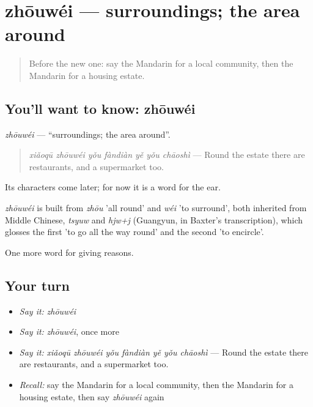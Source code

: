 \section[zhōuwéi]{zhōuwéi — surroundings; the area around}

\label{lesson:ZH-C377-zhouwei}



\begin{quote}
Before the new one: say the Mandarin for a local community, then the Mandarin for a housing estate.
\end{quote}

\subsection*{You'll want to know: zhōuwéi}
\emph{zhōuwéi} — \textquotedblleft{}surroundings; the area around\textquotedblright{}.

\begin{quote}
\emph{xiǎoqū zhōuwéi yǒu fàndiàn yě yǒu chāoshì} — Round the estate there are restaurants, and a supermarket too.
\end{quote}

Its characters come later; for now it is a word for the ear.

\begin{cousinweb}
\emph{zhōuwéi} is built from \emph{zhōu} 'all round' and \emph{wéi} 'to surround', both inherited from Middle Chinese, \emph{tsyuw} and \emph{hjw+j} (Guangyun, in Baxter's transcription), which glosses the first 'to go all the way round' and the second 'to encircle'.
\end{cousinweb}

\begin{grammarlens}[title={What you've built}]
One more word for giving reasons.
\end{grammarlens}

\subsection*{Your turn}
\begin{itemize}
\raggedright
  \item \emph{Say it:} \emph{zhōuwéi}
  \item \emph{Say it:} \emph{zhōuwéi}, once more
  \item \emph{Say it:} \emph{xiǎoqū zhōuwéi yǒu fàndiàn yě yǒu chāoshì} — Round the estate there are restaurants, and a supermarket too.
  \item \emph{Recall:} say the Mandarin for a local community, then the Mandarin for a housing estate, then say \emph{zhōuwéi} again
\end{itemize}

